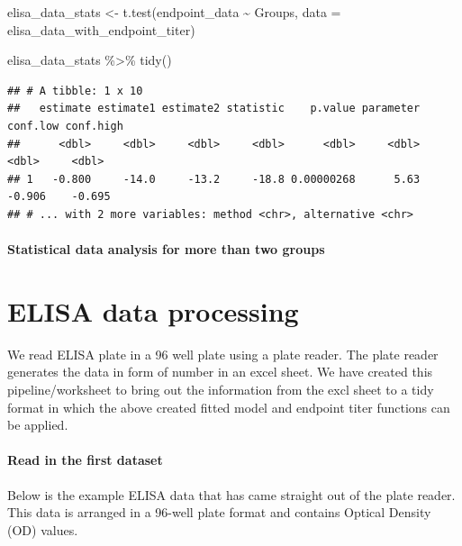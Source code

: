 \documentclass[
]{book}
\newenvironment{Shaded}{\begin{snugshade}}{\end{snugshade}}
\newcommand{\AttributeTok}[1]{\textcolor[rgb]{0.77,0.63,0.00}{#1}}
\newcommand{\FunctionTok}[1]{\textcolor[rgb]{0.00,0.00,0.00}{#1}}
\newcommand{\NormalTok}[1]{#1}
\newcommand{\OtherTok}[1]{\textcolor[rgb]{0.56,0.35,0.01}{#1}}
\newcommand{\SpecialCharTok}[1]{\textcolor[rgb]{0.00,0.00,0.00}{#1}}
\begin{document}
\begin{Shaded}
\begin{Highlighting}[]
\NormalTok{elisa\_data\_stats }\OtherTok{\textless{}{-}} \FunctionTok{t.test}\NormalTok{(endpoint\_data }\SpecialCharTok{\textasciitilde{}}\NormalTok{ Groups, }
                           \AttributeTok{data =}\NormalTok{ elisa\_data\_with\_endpoint\_titer)}

\NormalTok{elisa\_data\_stats }\SpecialCharTok{\%\textgreater{}\%}
  \FunctionTok{tidy}\NormalTok{()}
\end{Highlighting}
\end{Shaded}

\begin{verbatim}
## # A tibble: 1 x 10
##   estimate estimate1 estimate2 statistic    p.value parameter conf.low conf.high
##      <dbl>     <dbl>     <dbl>     <dbl>      <dbl>     <dbl>    <dbl>     <dbl>
## 1   -0.800     -14.0     -13.2     -18.8 0.00000268      5.63   -0.906    -0.695
## # ... with 2 more variables: method <chr>, alternative <chr>
\end{verbatim}

\hypertarget{statistical-data-analysis-for-more-than-two-groups}{%
\subsubsection{Statistical data analysis for more than two groups}\label{statistical-data-analysis-for-more-than-two-groups}}

\hypertarget{elisa-data-processing}{%
\chapter{ELISA data processing}\label{elisa-data-processing}}

We read ELISA plate in a 96 well plate using a plate reader. The plate reader generates the data in form of number in an excel sheet. We have created this pipeline/worksheet to bring out the information from the excl sheet to a tidy format in which the above created fitted model and endpoint titer functions can be applied.

\hypertarget{read-in-the-first-dataset}{%
\subsubsection{Read in the first dataset}\label{read-in-the-first-dataset}}

Below is the example ELISA data that has came straight out of the plate reader. This data is arranged in a 96-well plate format and contains Optical Density (OD) values.
\end{document}
